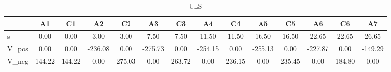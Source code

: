 \begin{table}[H]
\caption{ULS}
\begin{tabular}{lSSSSSSSSSSSSS}
\toprule
{} & {A1} & {C1} & {A2} & {C2} & {A3} & {C3} & {A4} & {C4} & {A5} & {C5} & {A6} & {C6} & {A7} \\
\midrule
s & 0.00 & 0.00 & 3.00 & 3.00 & 7.50 & 7.50 & 11.50 & 11.50 & 16.50 & 16.50 & 22.65 & 22.65 & 26.65 \\
V_pos & 0.00 & 0.00 & -236.08 & 0.00 & -275.73 & 0.00 & -254.15 & 0.00 & -255.13 & 0.00 & -227.87 & 0.00 & -149.29 \\
V_neg & 144.22 & 144.22 & 0.00 & 275.03 & 0.00 & 263.72 & 0.00 & 236.15 & 0.00 & 235.45 & 0.00 & 184.80 & 0.00 \\
\bottomrule
\end{tabular}
\end{table}

